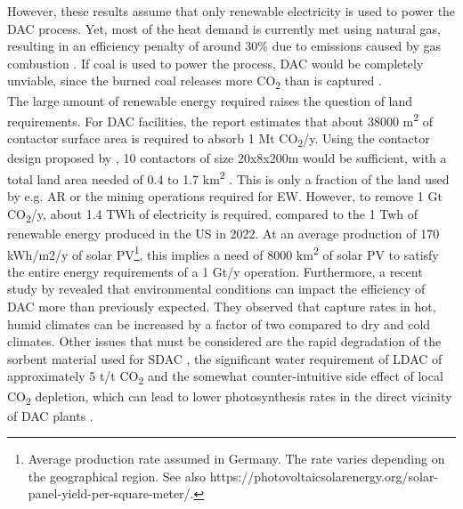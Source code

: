 However, these results assume that only renewable electricity is used to power the DAC process. Yet, most of the heat demand is currently met using natural gas, resulting in an efficiency penalty of around 30\% due to emissions caused by gas combustion \parencite{Fuss2018NegativeEffects}. If coal is used to power the process, DAC would be completely unviable, since the burned coal releases more CO\textsubscript{2} than is captured \parencite{Erans2022DirectChallenges, NRC2015ClimateSequestration}.\\
The large amount of renewable energy required raises the question of land requirements. For DAC facilities, the \textcite{NAS2018NegativeAgenda} report estimates that about 38000 m\textsuperscript{2} of contactor surface area is required to absorb 1 Mt CO\textsubscript{2}/y. Using the contactor design proposed by \textcite{Holmes2012AnAir}, 10 contactors of size 20x8x200m would be sufficient, with a total land area needed of 0.4 to 1.7 km\textsuperscript{2} \parencite[23]{IEA2022DirectZero}. This is only a fraction of the land used by e.g. AR or the mining operations required for EW.
However, to remove 1 Gt CO\textsubscript{2}/y, about 1.4 TWh of electricity is required, compared to the 1 Twh of renewable energy produced in the US in 2022. At an average production of 170 kWh/m2/y of solar PV\footnote{Average production rate assumed in Germany. The rate varies depending on the geographical region. See also https://photovoltaicsolarenergy.org/solar-panel-yield-per-square-meter/.}, this implies a need of 8000 km\textsuperscript{2} of solar PV to satisfy the entire energy requirements of a 1 Gt/y operation.
Furthermore, a recent study by \textcite{An2022TheSystems} revealed that environmental conditions can impact the efficiency of DAC more than previously expected. They observed that capture rates in hot, humid climates can be increased by a factor of two compared to dry and cold climates. Other issues that must be considered are the rapid degradation of the sorbent material used for SDAC \parencite{Lawler2022WhatTechnology}, the significant water requirement of LDAC of approximately 5 t/t CO\textsubscript{2} \parencite{IEA2022DirectZero} and the somewhat counter-intuitive side effect of local CO\textsubscript{2} depletion, which can lead to lower photosynthesis rates in the direct vicinity of DAC plants \parencite[230]{NAS2018NegativeAgenda}.
